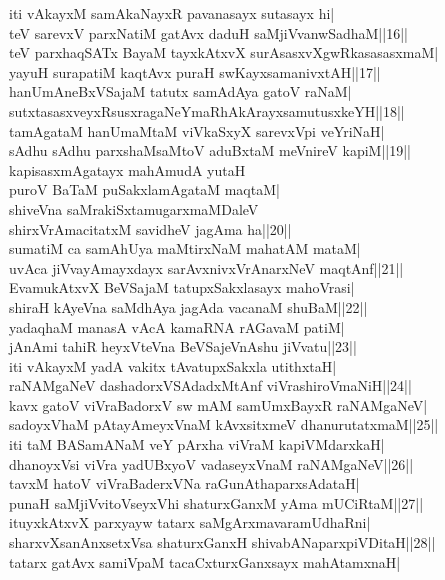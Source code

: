 \documentclass{article}
\begin{document}
iti vAkayxM samAkaNayxR pavanasayx sutasayx hi|\\
teV sarevxV parxNatiM gatAvx daduH saMjiVvanwSadhaM||16||\\
teV parxhaqSATx BayaM tayxkAtxvX surAsasxvXgwRkasasasxmaM|\\
yayuH surapatiM kaqtAvx puraH swKayxsamanivxtAH||17||\\
hanUmAneBxVSajaM tatutx samAdAya gatoV raNaM|\\
sutxtasasxveyxRsusxragaNeYmaRhAkArayxsamutusxkeYH||18||\\
tamAgataM hanUmaMtaM viVkaSxyX sarevxVpi veYriNaH|\\
sAdhu sAdhu parxshaMsaMtoV aduBxtaM meVnireV kapiM||19||\\
kapisasxmAgatayx mahAmudA yutaH\\
puroV BaTaM puSakxlamAgataM maqtaM|\\
shiveVna saMrakiSxtamugarxmaMDaleV\\
shirxVrAmacitatxM savidheV jagAma ha||20||\\
sumatiM ca samAhUya maMtirxNaM mahatAM mataM|\\
uvAca jiVvayAmayxdayx sarAvxnivxVrAnarxNeV maqtAnf||21||\\
EvamukAtxvX BeVSajaM tatupxSakxlasayx mahoVrasi|\\
shiraH kAyeVna saMdhAya jagAda vacanaM shuBaM||22||\\
yadaqhaM manasA vAcA kamaRNA rAGavaM patiM|\\
jAnAmi tahiR heyxVteVna BeVSajeVnAshu jiVvatu||23||\\
iti vAkayxM yadA vakitx tAvatupxSakxla utithxtaH|\\
raNAMgaNeV dashadorxVSAdadxMtAnf viVrashiroVmaNiH||24||\\
kavx gatoV viVraBadorxV sw mAM samUmxBayxR raNAMgaNeV|\\
sadoyxVhaM pAtayAmeyxVnaM kAvxsitxmeV dhanurutatxmaM||25||\\
iti taM BASamANaM veY pArxha viVraM kapiVMdarxkaH|\\
dhanoyxVsi viVra yadUBxyoV vadaseyxVnaM raNAMgaNeV||26||\\
tavxM hatoV viVraBaderxVNa raGunAthaparxsAdataH|\\
punaH saMjiVvitoVseyxVhi shaturxGanxM yAma mUCiRtaM||27||\\
ituyxkAtxvX parxyayw tatarx saMgArxmavaramUdhaRni|\\
sharxvXsanAnxsetxVsa shaturxGanxH shivabANaparxpiVDitaH||28||\\
tatarx gatAvx samiVpaM tacaCxturxGanxsayx mahAtamxnaH|\\
\end{document}
